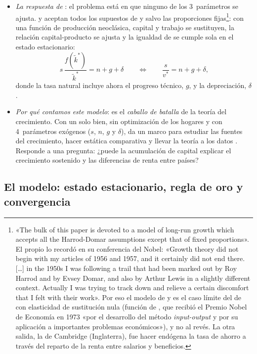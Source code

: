 \documentclass[11pt]{article}
\begin{document}
\begin{itemize}
\item \emph{La respuesta de }: el problema está en que ninguno de los 3~parámetros se ajusta. \textcite{Solow1956} y \textcite{Swan1956} aceptan todos los supuestos de  y  salvo las proporciones fijas\footnote{«The bulk of this paper is devoted to a model of long-run growth which accepts all the Harrod-Domar assumptions except that of fixed proportions»\nocite{Solow1956}. El propio  lo recordó en su conferencia del Nobel: «Growth theory did not begin with my articles of 1956 and 1957, and it certainly did not end there. […] in the 1950s I was following a trail that had been marked out by Roy Harrod and by Evsey Domar, and also by Arthur Lewis in a slightly different context. Actually I was trying to track down and relieve a certain discomfort that I felt with their work»\nocite{Solow1987Nobel}. Por eso el modelo de  y  es el caso límite del de  con elasticidad de sustitución nula (función de , que recibió el Premio Nobel de Economía en 1973 «por el desarrollo del método \emph{input-output} y por su aplicación a importantes problemas económicos»\nocite{Nobel1973Leontief}), y no al revés. La otra salida, la de Cambridge (Inglaterra), fue hacer endógena la tasa de ahorro a través del reparto de la renta entre salarios y beneficios\nocite{Kaldor1957Model,Pasinetti1962Rate}.}: con una función de producción neoclásica, capital y trabajo se sustituyen, la relación capital-producto se ajusta y la igualdad de  se cumple sola en el estado estacionario:
  \[s\,\frac{f(\tilde k^*)}{\tilde k^*}=n+g+\delta\qquad\Longleftrightarrow\qquad \frac{s}{v^*}=n+g+\delta,\]
  donde la tasa natural incluye ahora el progreso técnico, $g$, y la depreciación, $\delta$.
\item \emph{Por qué contamos este modelo}: es el \emph{caballo de batalla} de la teoría del crecimiento. Con un solo bien, sin optimización de los hogares y con 4~parámetros exógenos ($s$, $n$, $g$ y $\delta$), da un marco para estudiar las fuentes del crecimiento, hacer estática comparativa y llevar la teoría a los datos . Responde a una pregunta: ¿puede la acumulación de capital explicar el crecimiento sostenido y las diferencias de renta entre países?
\end{itemize}

\subsection{El modelo: estado estacionario, regla de oro y convergencia}\label{sec:solow-modelo}
\end{document}
